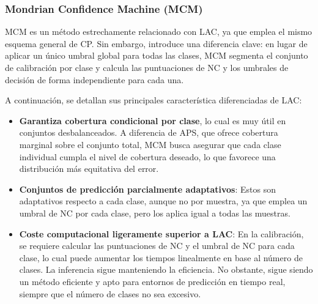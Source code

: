 

\subsubsection{Mondrian Confidence Machine (MCM)}

\acrshort{MCM} \cite{vovk2003} es un método estrechamente relacionado con \acrshort{LAC}, ya que emplea el mismo esquema general de \acrshort{CP}. Sin embargo, introduce una diferencia clave: en lugar de aplicar un único umbral global para todas las clases, \acrshort{MCM} segmenta el conjunto de calibración por clase y calcula las puntuaciones de \acrshort{NC} y los umbrales de decisión de forma independiente para cada una.

A continuación, se detallan sus principales característica diferenciadas de \acrshort{LAC}:

\begin{itemize}

    \item \textbf{Garantiza cobertura condicional por clase}, lo cual es muy útil en conjuntos desbalanceados. A diferencia de \acrshort{APS}, que ofrece cobertura marginal sobre el conjunto total, MCM busca asegurar que cada clase individual cumpla el nivel de cobertura deseado, lo que favorece una distribución más equitativa del error.
    
    \item \textbf{Conjuntos de predicción parcialmente adaptativos}: Estos son adaptativos respecto a cada clase, aunque no por muestra, ya que emplea un umbral de \acrshort{NC} por cada clase, pero los aplica igual a todas las muestras.  

    \item \textbf{Coste computacional ligeramente superior a \acrshort{LAC}}: En la calibración, se requiere calcular las puntuaciones de \acrshort{NC} y el umbral de \acrshort{NC} para cada clase, lo cual puede aumentar los tiempos linealmente en base al número de clases. La inferencia sigue manteniendo la eficiencia. No obstante, sigue siendo un método eficiente y apto para entornos de predicción en tiempo real, siempre que el número de clases no sea excesivo.

\end{itemize}

